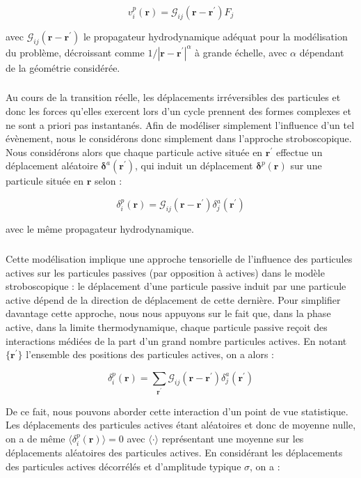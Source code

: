 \begin{equation}
	v^p_i(\mathbf{r}) = \mathcal{G}_{ij}(\mathbf{r}-\mathbf{r}^\prime)F_j
\end{equation}

\noindent avec $\mathcal{G}_{ij}(\mathbf{r}-\mathbf{r}^\prime)$ le propagateur hydrodynamique adéquat pour la modélisation du problème, décroissant comme $1/|\mathbf{r}-\mathbf{r}^\prime|^\alpha$ à grande échelle, avec $\alpha$ dépendant de la géométrie considérée.

\subparagraph{}Au cours de la transition réelle, les déplacements irréversibles des particules et donc les forces qu'elles exercent lors d'un cycle prennent des formes complexes et ne sont a priori pas instantanés. Afin de modéliser simplement l'influence d'un tel évènement, nous le considérons donc simplement dans l'approche stroboscopique. Nous considérons alors que chaque particule active située en $\mathbf{r}^\prime$ effectue un déplacement aléatoire $\boldsymbol\delta^a(\mathbf{r}^\prime)$, qui induit un déplacement $\boldsymbol\delta^p(\mathbf{r})$ sur une particule située en $\mathbf{r}$ selon :

\begin{equation}
	\delta^p_i(\mathbf{r}) = \mathcal{G}_{ij}(\mathbf{r}-\mathbf{r}^\prime)\delta^a_j(\mathbf{r}^\prime)
\end{equation}

\noindent avec le même propagateur hydrodynamique.

\subparagraph{}Cette modélisation implique une approche tensorielle de l'influence des particules actives sur les particules passives (par opposition à actives) dans le modèle stroboscopique : le déplacement d'une particule passive induit par une particule active dépend de la direction de déplacement de cette dernière. Pour simplifier davantage cette approche, nous nous appuyons sur le fait que, dans la phase active, dans la limite thermodynamique, chaque particule passive reçoit des interactions médiées de la part d'un grand nombre particules actives. En notant $\{ \mathbf{r}^\prime \}$ l'ensemble des positions des particules actives, on a alors :

\begin{equation}
	\delta^p_i(\mathbf{r}) = \sum_{\mathbf{r}^\prime}\mathcal{G}_{ij}(\mathbf{r}-\mathbf{r}^\prime)\delta^a_j(\mathbf{r}^\prime)
\end{equation}

\noindent De ce fait, nous pouvons aborder cette interaction d'un point de vue statistique. Les déplacements des particules actives étant aléatoires et donc de moyenne nulle, on a de même $\langle \delta^p_i(\mathbf{r}) \rangle = 0$ avec $\langle \cdot \rangle$ représentant une moyenne sur les déplacements aléatoires des particules actives. En considérant les déplacements des particules actives décorrélés et d'amplitude typique $\sigma$, on a :

